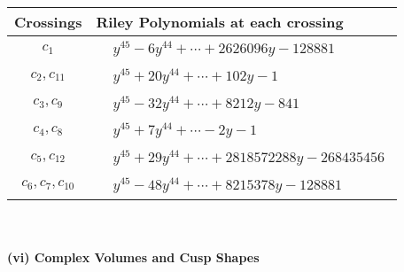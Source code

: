 \documentclass[1p]{elsarticle_modified}
\theoremstyle{definition}
\begin{document}
\begin{tabular}{m{50pt}|m{274pt}}
Crossings & \hspace{64pt}Riley Polynomials at each crossing \\
\hline $$\begin{aligned}c_{1}\end{aligned}$$&$\begin{aligned}
&y^{45}-6 y^{44}+\cdots+2626096 y-128881
\end{aligned}$\\
\hline $$\begin{aligned}c_{2},c_{11}\end{aligned}$$&$\begin{aligned}
&y^{45}+20 y^{44}+\cdots+102 y-1
\end{aligned}$\\
\hline $$\begin{aligned}c_{3},c_{9}\end{aligned}$$&$\begin{aligned}
&y^{45}-32 y^{44}+\cdots+8212 y-841
\end{aligned}$\\
\hline $$\begin{aligned}c_{4},c_{8}\end{aligned}$$&$\begin{aligned}
&y^{45}+7 y^{44}+\cdots-2 y-1
\end{aligned}$\\
\hline $$\begin{aligned}c_{5},c_{12}\end{aligned}$$&$\begin{aligned}
&y^{45}+29 y^{44}+\cdots+2818572288 y-268435456
\end{aligned}$\\
\hline $$\begin{aligned}c_{6},c_{7},c_{10}\end{aligned}$$&$\begin{aligned}
&y^{45}-48 y^{44}+\cdots+8215378 y-128881
\end{aligned}$\\
\hline
\end{tabular}\\~\\
\newpage\flushleft \textbf{(vi) Complex Volumes and Cusp Shapes}
\end{document}
